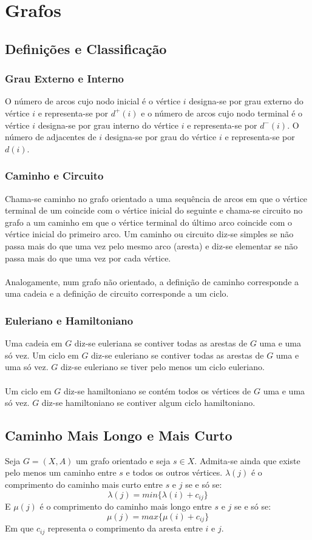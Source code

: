 \documentclass[10pt,a4paper]{report}
\begin{document}
\chapter{Grafos}
\section{Definições e Classificação}
\subsection{Grau Externo e Interno}
O número de arcos cujo nodo inicial é o vértice $i$ designa-se por grau externo do vértice $i$ e representa-se por $d^+(i)$ e o número de arcos cujo nodo terminal é o vértice $i$ designa-se por grau interno do vértice $i$ e representa-se por $d^-(i)$. O número de adjacentes de $i$ designa-se por grau do vértice $i$ e representa-se por $d(i)$.
\subsection{Caminho e Circuito}
Chama-se caminho no grafo orientado a uma sequência de arcos em que o vértice
terminal de um coincide com o vértice inicial do seguinte e chama-se circuito no grafo a um caminho em que o vértice terminal do último arco coincide com o vértice inicial do primeiro arco. Um caminho ou circuito diz-se simples se não passa mais do que uma vez pelo mesmo arco (aresta) e diz-se elementar se não passa mais do que uma vez por cada vértice.\\
\\
Analogamente, num grafo não orientado, a definição de caminho corresponde a  uma cadeia e a definição de circuito corresponde a um ciclo.
\subsection{Euleriano e Hamiltoniano}
Uma cadeia em $G$ diz-se euleriana se contiver todas as arestas de $G$ uma e uma só vez. Um ciclo em $G$ diz-se euleriano se contiver todas as arestas de $G$ uma e uma só vez. $G$ diz-se euleriano se tiver pelo menos um ciclo euleriano.\\
\\
Um ciclo em $G$ diz-se hamiltoniano se contém todos os vértices de $G$ uma e uma só vez. $G$ diz-se hamiltoniano se contiver algum ciclo hamiltoniano.
\section{Caminho Mais Longo e Mais Curto}
Seja $G=(X,A)$ um grafo orientado e seja $s \in X$. Admita-se ainda que existe pelo menos um caminho entre $s$ e todos os outros vértices. $\lambda(j)$ é o comprimento do caminho mais curto entre $s$ e $j$ se e só se:
$$
\lambda(j) = min \{\lambda (i) + c_{ij}\}
$$
E $\mu(j)$ é o comprimento do caminho mais longo entre $s$ e $j$ se e só se:
$$
\mu (j) = max \{\mu(i) + c_{ij}\}
$$
Em que $c_{ij}$ representa o comprimento da aresta entre $i$ e $j$.
\end{document}
